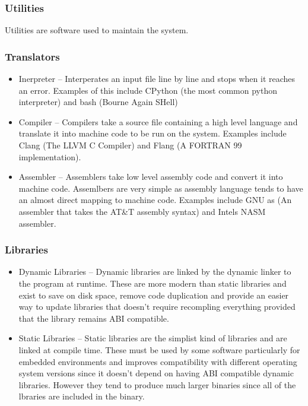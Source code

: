 \documentclass{article}
\begin{document}
\subsubsection{Utilities}
Utilities are software used to maintain the system.

\subsubsection{Translators}

\begin{itemize}
	\item Inerpreter -- Interperates an input file line by line and stops when it reaches an error. Examples of 
	this include CPython (the most common python interpreter) and bash (Bourne Again SHell)
	\item Compiler -- Compilers take a source file containing a high level language and translate it into machine code
	to be run on the system. Examples include Clang (The LLVM C Compiler) and Flang (A FORTRAN 99 implementation).
	\item Assembler -- Assemblers take low level assembly code and convert it into machine code. Assemlbers are very simple
	as assembly language tends to have an almost direct mapping to machine code. Examples include GNU as (An assembler that takes
	the AT\&T assembly syntax) and Intels NASM assembler.
\end{itemize}

\subsubsection{Libraries}

\begin{itemize}
	\item Dynamic Libraries -- Dynamic libraries are linked by the dynamic linker to the program at runtime. These are more modern
	than static libraries and exist to save on disk space, remove code duplication and provide an easier way to update libraries
	that doesn't require recompling everything provided that the library remains ABI compatible.
	\item Static Libraries -- Static libraries are the simplist kind of libraries and are linked at compile time. These must be used
	by some software particularly for embedded environments and improves compatibility with different operating system versions since
	it doesn't depend on having ABI compatible dynamic libraries. However they tend to produce much larger binaries since all of the
	lbraries are included in the binary.
\end{itemize}
\end{document}
